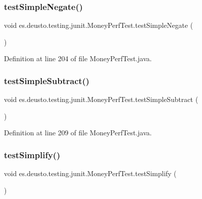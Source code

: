 \subsubsection{\texorpdfstring{testSimpleNegate()}{testSimpleNegate()}}
{\footnotesize\ttfamily void es.\+deusto.\+testing.\+junit.\+Money\+Perf\+Test.\+test\+Simple\+Negate (\begin{DoxyParamCaption}{ }\end{DoxyParamCaption})}



Definition at line 204 of file Money\+Perf\+Test.\+java.

\mbox{\label{classes_1_1deusto_1_1testing_1_1junit_1_1_money_perf_test_a5b451d9e084b5074a0ff88ddf1c62106}} 
\subsubsection{\texorpdfstring{testSimpleSubtract()}{testSimpleSubtract()}}
{\footnotesize\ttfamily void es.\+deusto.\+testing.\+junit.\+Money\+Perf\+Test.\+test\+Simple\+Subtract (\begin{DoxyParamCaption}{ }\end{DoxyParamCaption})}



Definition at line 209 of file Money\+Perf\+Test.\+java.

\mbox{\label{classes_1_1deusto_1_1testing_1_1junit_1_1_money_perf_test_ad40abfb76d9d9055915e5b4e86e047d8}} 
\subsubsection{\texorpdfstring{testSimplify()}{testSimplify()}}
{\footnotesize\ttfamily void es.\+deusto.\+testing.\+junit.\+Money\+Perf\+Test.\+test\+Simplify (\begin{DoxyParamCaption}{ }\end{DoxyParamCaption})}



